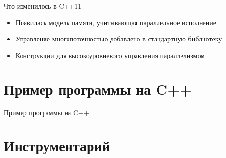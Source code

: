 \documentclass[unknownkeysallowed,xcolor=table]{beamer}
\makeatletter
\newcommand{\srcmediumsize}{\@setfontsize{\srcmediumsize}{7pt}{7pt}}
\makeatother
\begin{document}
\begin{frame}{Что изменилось в C++11}
  \begin{itemize}
    \item Появилась модель памяти, учитывающая параллельное исполнение \vspace{3em}
    \item Управление многопоточностью добавлено в стандартную библиотеку \vspace{3em}
    \item Конструкции для высокоуровневого управления параллелизмом \vspace{3em}
  \end{itemize}
\end{frame}

\section{Пример программы на C++}

\begin{frame}[fragile]{Пример программы на C++}
  
\end{frame}

\section{Инструментарий}
\end{document}
